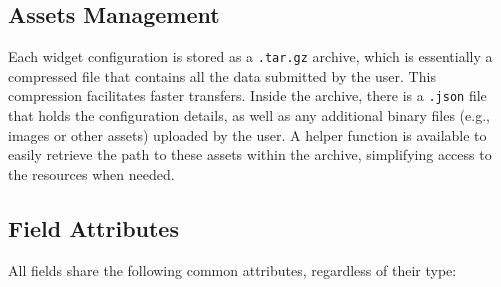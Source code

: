 \subsection{Assets Management}
Each widget configuration is stored as a \texttt{.tar.gz} archive, which is essentially a compressed file that contains all the data submitted by the user. This compression facilitates faster transfers. Inside the archive, there is a \texttt{.json} file that holds the configuration details, as well as any additional binary files (e.g., images or other assets) uploaded by the user. A helper function is available to easily retrieve the path to these assets within the archive, simplifying access to the resources when needed.

\subsection{Field Attributes}
All fields share the following common attributes, regardless of their type:

